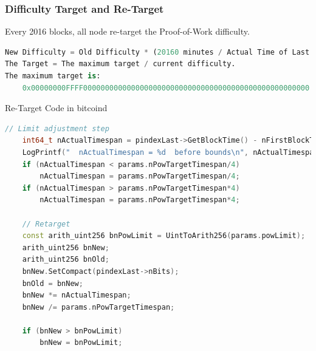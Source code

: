 \begin{frame}[fragile]
    \frametitle{Difficulty Target and Re-Target}
    Every 2016 blocks, all node re-target the Proof-of-Work difficulty.
    \begin{lstlisting}[language=Python]
New Difficulty = Old Difficulty * (20160 minutes / Actual Time of Last 2016 Blocks)
The Target = The maximum target / current difficulty.
The maximum target is:
    0x00000000FFFF0000000000000000000000000000000000000000000000000000 \end{lstlisting}

    Re-Target Code in bitcoind
    \begin{lstlisting}[language=C++]
    // Limit adjustment step
    int64_t nActualTimespan = pindexLast->GetBlockTime() - nFirstBlockTime;
    LogPrintf("  nActualTimespan = %d  before bounds\n", nActualTimespan);
    if (nActualTimespan < params.nPowTargetTimespan/4)
        nActualTimespan = params.nPowTargetTimespan/4;
    if (nActualTimespan > params.nPowTargetTimespan*4)
        nActualTimespan = params.nPowTargetTimespan*4;

    // Retarget
    const arith_uint256 bnPowLimit = UintToArith256(params.powLimit);
    arith_uint256 bnNew;
    arith_uint256 bnOld;
    bnNew.SetCompact(pindexLast->nBits);
    bnOld = bnNew;
    bnNew *= nActualTimespan;
    bnNew /= params.nPowTargetTimespan;

    if (bnNew > bnPowLimit)
        bnNew = bnPowLimit; \end{lstlisting}
\end{frame}
